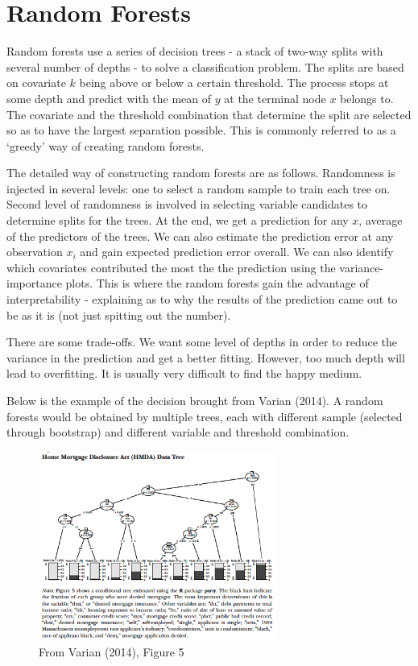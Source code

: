 \section{Random Forests}
Random forests use a series of decision trees - a stack of two-way splits with several number of depths - to solve a classification problem. The splits are based on covariate $k$ being above or below a certain threshold. The process stops at some depth and predict with the mean of $y$ at the terminal node $x$ belongs to. The covariate and the threshold combination that determine the split are selected so as to have the largest separation possible. This is commonly referred to as a `greedy' way of creating random forests.  \par
The detailed way of constructing random forests are as follows. Randomness is injected in several levels: one to select a random sample to train each tree on. Second level of randomness is involved in selecting variable candidates to determine splits for the trees. At the end, we get a prediction for any $x$, average of the predictors of the trees. We can also estimate the prediction error at any observation $x_i$ and gain expected prediction error overall. We can also identify which covariates contributed the most the the prediction using the variance-importance plots. This is where the random forests gain the advantage of interpretability - explaining as to why the results of the prediction came out to be as it is (not just spitting out the number). \par
There are some trade-offs. We want some level of depths in order to reduce the variance in the prediction and get a better fitting. However, too much depth will lead to overfitting. It is usually very difficult to find the happy medium. \par
Below is the example of the decision brought from Varian (2014). A random forests would be obtained by multiple trees, each with different sample (selected through bootstrap) and different variable and threshold combination. 
\begin{figure}[H]
\centering
\includegraphics[width=0.7\textwidth, keepaspectratio]{randomforest.png}
\caption{From Varian (2014), Figure 5}
\end{figure}\par
